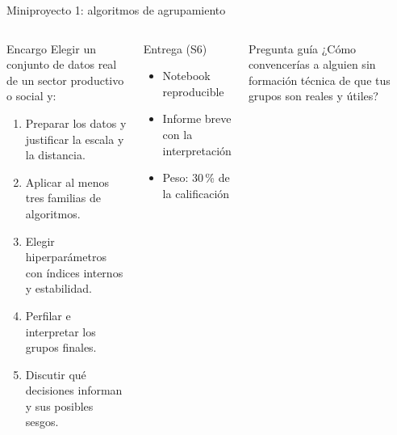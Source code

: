 \documentclass[aspectratio=169,11pt]{beamer}
\begin{document}
\begin{frame}{Miniproyecto 1: algoritmos de agrupamiento}
  \begin{columns}[T]
    \begin{block}{Encargo}
      Elegir un conjunto de datos real de un sector productivo o social y:
      \begin{enumerate}
        \item Preparar los datos y justificar la escala y la distancia.
        \item Aplicar al menos tres familias de algoritmos.
        \item Elegir hiperparámetros con índices internos y estabilidad.
        \item Perfilar e interpretar los grupos finales.
        \item Discutir qué decisiones informan y sus posibles sesgos.
      \end{enumerate}
    \end{block}
    \begin{exampleblock}{Entrega (S6)}
      \begin{itemize}
        \item Notebook reproducible
        \item Informe breve con la interpretación
        \item Peso: 30\,\% de la calificación
      \end{itemize}
    \end{exampleblock}
    \begin{alertblock}{Pregunta guía}
      ¿Cómo convencerías a alguien sin formación técnica de que tus grupos son reales y útiles?
    \end{alertblock}
  \end{columns}
\end{frame}
\end{document}
